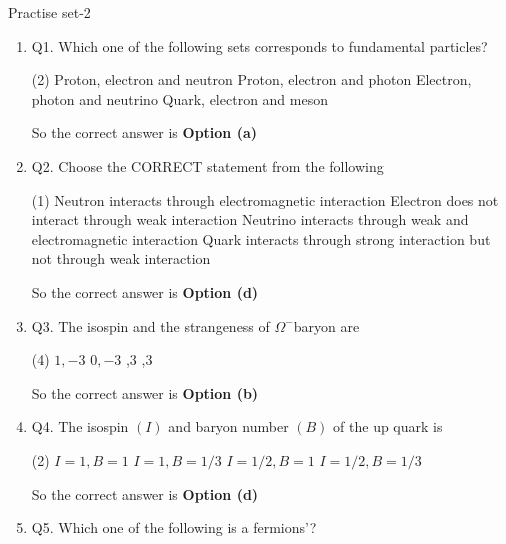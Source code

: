 \begin{abox}
	Practise set-2
\end{abox}
\begin{enumerate}
	\item Q1. Which one of the following sets corresponds to fundamental particles?
	 {}
	 \begin{tasks}(2)
		\task[\textbf{a.}]Proton, electron and neutron
		\task[\textbf{b.}]Proton, electron and photon
		\task[\textbf{c.}]Electron, photon and neutrino
		\task[\textbf{d.}]Quark, electron and meson 
	\end{tasks}
\begin{answer}
So the correct answer is \textbf{Option (a)}
\end{answer}
	\item Q2. Choose the CORRECT statement from the following
	 \begin{tasks}(1)
		\task[\textbf{a.}]Neutron interacts through electromagnetic interaction
		\task[\textbf{b.}]Electron does not interact through weak interaction
		\task[\textbf{c.}]Neutrino interacts through weak and electromagnetic interaction
		\task[\textbf{d.}] Quark interacts through strong interaction but not through weak interaction
	\end{tasks}
\begin{answer}
	So the correct answer is \textbf{Option (d)}
\end{answer}
	\item Q3. The isospin and the strangeness of $\Omega^{-}$baryon are
	{}
	 \begin{tasks}(4)
		\task[\textbf{a.}]$1,-3$
		\task[\textbf{b.}]$0,-3$
		,3
		,3 
	\end{tasks}
\begin{answer}
	So the correct answer is \textbf{Option (b)}
\end{answer}
	\item Q4. The isospin $(I)$ and baryon number $(B)$ of the up quark is
	{}
	 \begin{tasks}(2)
		\task[\textbf{a.}]$I=1, B=1$
		\task[\textbf{b.}]$I=1, B=1 / 3$
		\task[\textbf{c.}]$I=1 / 2, B=1$
		\task[\textbf{d.}]$I=1 / 2, B=1 / 3$ 
	\end{tasks}
\begin{answer}
	So the correct answer is \textbf{Option (d)}
\end{answer}
	\item Q5. Which one of the following is a fermions'?

\end{enumerate}
